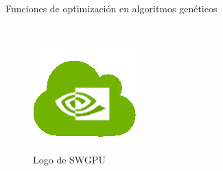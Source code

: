 \begin{center}
{\LARGE\bfseries\titulo}\\
\end{center}

\begin{center}
	Funciones de optimización en algoritmos genéticos
\end{center}

\begin{center}
	\autor\
\end{center}


\begin{figure}[h]
\centering
\includegraphics[width=0.2\linewidth]{../images/logo_swgpu}
\caption[Logo de SWGPU]{Logo de SWGPU}
\label{fig:logo}
\end{figure}

\newpage


